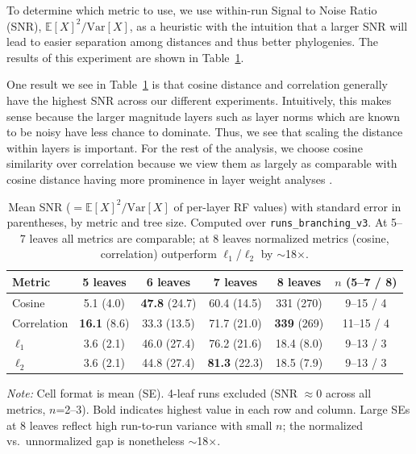 \documentclass{article}
\begin{document}
To determine which metric to use, we use within-run Signal to Noise Ratio (SNR), $\mathbb{E}[X]^2/\mathrm{Var}[X]$, as a heuristic with the intuition that a larger SNR will lead to easier separation among distances and thus better phylogenies.  The results of this experiment are shown in Table~\ref{tab:metric-snr}.

One result we see in Table~\ref{tab:metric-snr} is that cosine distance and correlation generally have the highest SNR across our different experiments.  Intuitively, this makes sense because the larger magnitude layers such as layer norms which are known to be noisy \cite{} have less chance to dominate.  Thus, we see that scaling the distance within layers is important.  For the rest of the analysis, we choose cosine similarity over correlation because we view them as largely as comparable with cosine distance having more prominence in layer weight analyses \cite{}.

\begin{table}[t]
\centering
\caption{Mean SNR ($= \mathbb{E}[X]^2/\mathrm{Var}[X]$ of per-layer RF values) with standard error in parentheses, by metric and tree size. Computed over \texttt{runs\_branching\_v3}. At 5--7 leaves all metrics are comparable; at 8 leaves normalized metrics (cosine, correlation) outperform $\ell_1$/$\ell_2$ by $\sim$18$\times$.}
\label{tab:metric-snr}
\begin{tabular}{lccccc}
\toprule
Metric & 5 leaves & 6 leaves & 7 leaves & 8 leaves & $n$ (5--7 / 8) \\
\midrule
Cosine      & 5.1 (4.0)   & \textbf{47.8} (24.7) & 60.4 (14.5) & 331 (270) & 9--15 / 4 \\
Correlation & \textbf{16.1} (8.6)  & 33.3 (13.5) & 71.7 (21.0) & \textbf{339} (269) & 11--15 / 4 \\
$\ell_1$    & 3.6 (2.1)   & 46.0 (27.4) & 76.2 (21.6) & 18.4 (8.0) & 9--13 / 3 \\
$\ell_2$    & 3.6 (2.1)   & 44.8 (27.4) & \textbf{81.3} (22.3) & 18.5 (7.9) & 9--13 / 3 \\
\bottomrule
\end{tabular}
\smallskip

\noindent\textit{Note:} Cell format is mean (SE). 4-leaf runs excluded (SNR $\approx 0$ across all metrics, $n$=2--3). Bold indicates highest value in each row and column. Large SEs at 8 leaves reflect high run-to-run variance with small $n$; the normalized vs.\ unnormalized gap is nonetheless $\sim$18$\times$.
\end{table}
\end{document}
